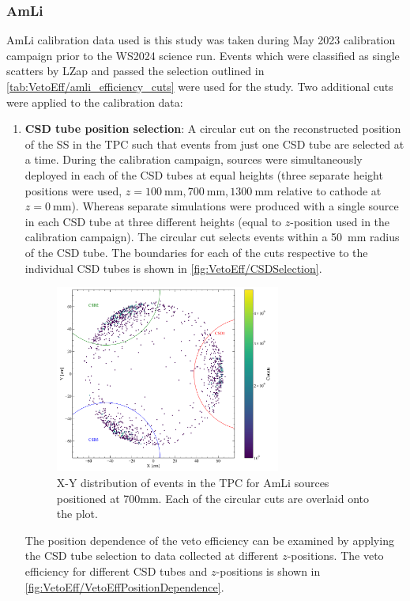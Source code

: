 \subsubsection{AmLi}
AmLi calibration data used is this study was taken during May 2023 calibration campaign prior to the WS2024 science run. Events which were classified as single scatters by LZap and passed the selection outlined in \ref{tab:VetoEff/amli_efficiency_cuts} were used for the study. Two additional cuts were applied to the calibration data:
\begin{enumerate}
	\item \textbf{CSD tube position selection}: A circular cut on the reconstructed position of the SS in the TPC such that events from just one CSD tube are selected at a time. During the calibration campaign, sources were simultaneously deployed in each of the CSD tubes at equal heights (three separate height positions were used, $z=100~\text{mm},700~\text{mm},1300~\text{mm}$ relative to cathode at $z=0~\text{mm}$). Whereas separate simulations were produced with a single source in each CSD tube at three different heights (equal to $z$-position used in the calibration campaign). 
    The circular cut selects events within a 50~mm radius of the CSD tube. The boundaries for each of the cuts respective to the individual CSD tubes is shown in \autoref{fig:VetoEff/CSDSelection}. 
    \begin{figure}[!ht]
    \centering
        \includegraphics[width=0.7\textwidth]{figures/VetoEfficiency/CircularCSDCut.pdf}
        \caption{X-Y distribution of events in the TPC for AmLi sources positioned at 700mm. Each of the circular cuts are overlaid onto the plot.}
        \label{fig:VetoEff/CSDSelection}
    \end{figure}
    The position dependence of the veto efficiency can be examined by applying the CSD tube selection to data collected at different $z$-positions. The veto efficiency for different CSD tubes and $z$-positions is shown in \autoref{fig:VetoEff/VetoEffPositionDependence}.

\end{enumerate}

